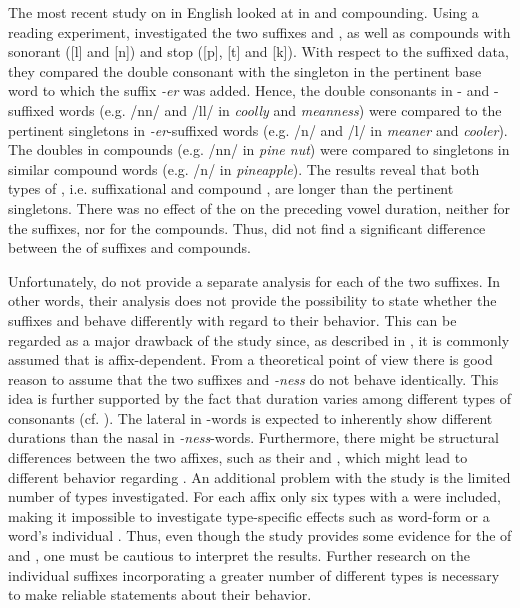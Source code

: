 The most recent study on  in English looked at  in  and compounding. Using a reading experiment, \cite{Kotzor.2016} investigated the two suffixes  and , as well as compounds with sonorant ([l] and [n]) and stop  ([p], [t] and [k]). With respect to the suffixed data, they compared the double consonant with the singleton in the pertinent base word to which the suffix \textit{-er} was added. Hence, the double consonants in - and -suffixed words (e.g. /nn/  and /ll/ in \textit{coolly} and \textit{meanness}) were compared to the pertinent singletons in \textit{-er}-suffixed words (e.g. /n/ and /l/ in \textit{meaner} and \textit{cooler}). The doubles in compounds (e.g. /nn/ in \textit{pine nut}) were compared to singletons in similar compound words (e.g. /n/ in \textit{pineapple}). 
The results reveal that both types of , i.e. suffixational and compound , are longer than the pertinent singletons. There was no effect of the  on the preceding vowel duration, neither for the suffixes, nor for the compounds. Thus, \cite{Kotzor.2016} did not find a significant difference between the  of suffixes and compounds. 

Unfortunately, \cite{Kotzor.2016} do not provide a separate analysis for each of the two suffixes. In other words, their analysis does not provide the possibility to state whether the suffixes  and  behave differently with regard to their  behavior. This can be regarded as a major drawback of the study since, as described in , it is commonly assumed that  is affix-dependent. From a theoretical point of view there is good reason to assume that the two suffixes  and \textit{-ness} do not behave identically. 
This idea is further supported by the fact that  duration varies among different types of consonants (cf. ). The lateral in -words is expected to inherently show different durations than the nasal in \textit{-ness}-words. Furthermore, there might be structural differences between the two affixes, such as their  and , which might lead to different behavior regarding . 
An additional problem with the study is the limited number of types investigated. For each affix only six types with a  were included, making it impossible to investigate type-specific effects such as word-form  or a word's individual . Thus, even though the study provides some evidence for the  of  and , one must be cautious to interpret the results. Further research on the individual suffixes incorporating a greater number of different types is necessary to make reliable statements about their  behavior.


